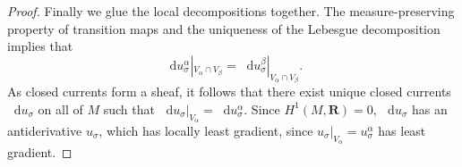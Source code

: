 \documentclass[reqno,11pt]{amsart}
\newcommand{\RR}{\mathbf{R}}
\newcommand{\Ball}{\mathbf{B}}
\newcommand*\dif{\mathop{}\!\mathrm{d}}
\newcommand{\dfn}[1]{\emph{#1}\index{#1}}
\theoremstyle{definition}
\newtheorem{example}[theorem]{Example}
\numberwithin{equation}{section}
\begin{document}
\begin{proof}
Finally we glue the local decompositions together.
The measure-preserving property of transition maps and the uniqueness of the Lebesgue decomposition implies that
$$\dif u^\alpha_\sigma|_{V_\alpha \cap V_\beta} = \dif u^\beta_\sigma|_{V_\alpha \cap V_\beta}.$$
As closed currents form a sheaf, it follows that there exist unique closed currents $\dif u_\sigma$ on all of $M$ such that $\dif u_\sigma|_{V_\alpha} = \dif u^\alpha_\sigma$.
Since $H^1(M, \RR) = 0$, $\dif u_\sigma$ has an antiderivative $u_\sigma$, which has locally least gradient, since $u_\sigma|_{V_\alpha} = u_\sigma^\alpha$ has least gradient.
\end{proof}




\end{document}
